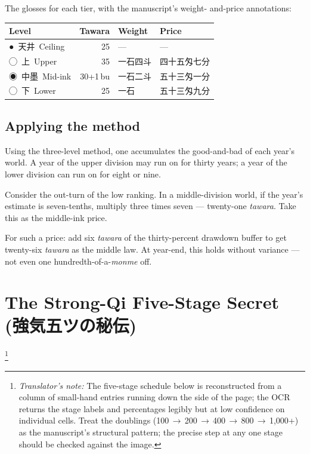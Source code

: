 \documentclass[10pt, openany]{book}
\newcommand{\jp}[1]{{\japanesefont #1}}
\newcommand{\tn}[1]{\footnote{\textit{Translator's note:} #1}}
\begin{document}
\noindent The glosses for each tier, with the manuscript's weight-
and-price annotations:

\begin{center}\small
\begin{tabular}{@{}l r l l@{}}
\toprule
\textbf{Level} & \textbf{Tawara} & \textbf{Weight} & \textbf{Price}\\
\midrule
\jp{●}\ \jp{天井}\ Ceiling  & 25       & ---            & --- \\
\jp{◯}\ \jp{上}\ Upper      & 35       & \jp{一石四斗}  & \jp{四十五匁七分}\\
\jp{◉}\ \jp{中墨}\ Mid-ink  & 30+1\,bu & \jp{一石二斗}  & \jp{五十三匁一分}\\
\jp{◯}\ \jp{下}\ Lower      & 25       & \jp{一石}      & \jp{五十三匁九分}\\
\bottomrule
\end{tabular}
\end{center}

\subsection*{Applying the method}

Using the three-level method, one accumulates the good-and-bad of
each year's world. A year of the upper division may run on for
thirty years; a year of the lower division can run on for eight or
nine.

Consider the out-turn of the low ranking. In a middle-division
world, if the year's estimate is seven-tenths, multiply three times
seven --- twenty-one \textit{tawara}. Take this as the middle-ink
price.

For such a price: add six \textit{tawara} of the thirty-percent
drawdown buffer to get twenty-six \textit{tawara} as the middle
law. At year-end, this holds without variance --- not even one
hundredth-of-a-\textit{monme} off.

\section{The Strong-Qi Five-Stage Secret (\jp{強気五ツの秘伝})}\tn{%
The five-stage schedule below is reconstructed from a column of
small-hand entries running down the side of the page; the OCR
returns the stage labels and percentages legibly but at low
confidence on individual cells. Treat the doublings
(100\,$\to$\,200\,$\to$\,400\,$\to$\,800\,$\to$\,1{,}000+) as the
manuscript's structural pattern; the precise step at any one stage
should be checked against the image.}
\end{document}
